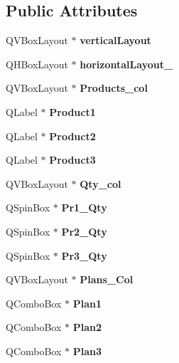 \subsection*{Public Attributes}
\begin{DoxyCompactItemize}
\item 
\mbox{\label{class_ui___purchase_order_ade1806de90dae059ba78d48df0c8ab2c}} 
Q\+V\+Box\+Layout $\ast$ {\bfseries vertical\+Layout}
\item 
\mbox{\label{class_ui___purchase_order_aeee8369086b8a9f9c0e2b3fc365a5615}} 
Q\+H\+Box\+Layout $\ast$ {\bfseries horizontal\+Layout\+\_}
\item 
\mbox{\label{class_ui___purchase_order_a71aa5c378b1addefbbf883f79be30500}} 
Q\+V\+Box\+Layout $\ast$ {\bfseries Products\+\_\+col}
\item 
\mbox{\label{class_ui___purchase_order_a551c9b36757c0eab6cd4fd8e8a9475f4}} 
Q\+Label $\ast$ {\bfseries Product1}
\item 
\mbox{\label{class_ui___purchase_order_a60a522950c624797fce1669585fd5bc5}} 
Q\+Label $\ast$ {\bfseries Product2}
\item 
\mbox{\label{class_ui___purchase_order_adc77bae8371385eeac1a3defe535fcce}} 
Q\+Label $\ast$ {\bfseries Product3}
\item 
\mbox{\label{class_ui___purchase_order_a1c9dee61aaaf1dee263113e333ab4105}} 
Q\+V\+Box\+Layout $\ast$ {\bfseries Qty\+\_\+col}
\item 
\mbox{\label{class_ui___purchase_order_aca8418bdb07b5ece0b9b320e1075f2c1}} 
Q\+Spin\+Box $\ast$ {\bfseries Pr1\+\_\+\+Qty}
\item 
\mbox{\label{class_ui___purchase_order_a643cbd107b94fc01c0832b702fef0fdd}} 
Q\+Spin\+Box $\ast$ {\bfseries Pr2\+\_\+\+Qty}
\item 
\mbox{\label{class_ui___purchase_order_aada4ba182effba6a40e56215adb69c6f}} 
Q\+Spin\+Box $\ast$ {\bfseries Pr3\+\_\+\+Qty}
\item 
\mbox{\label{class_ui___purchase_order_a26c928d02bbb1d0780c424dc80042521}} 
Q\+V\+Box\+Layout $\ast$ {\bfseries Plans\+\_\+\+Col}
\item 
\mbox{\label{class_ui___purchase_order_ab7cb5d4efc96d9d7beaa1f390e40b99a}} 
Q\+Combo\+Box $\ast$ {\bfseries Plan1}
\item 
\mbox{\label{class_ui___purchase_order_a3cf5495ab5039ea97c7e56809a2b6bc4}} 
Q\+Combo\+Box $\ast$ {\bfseries Plan2}
\item 
\mbox{\label{class_ui___purchase_order_a40030287815ae59edd971008f0aa67cb}} 
Q\+Combo\+Box $\ast$ {\bfseries Plan3}

\end{DoxyCompactItemize}
